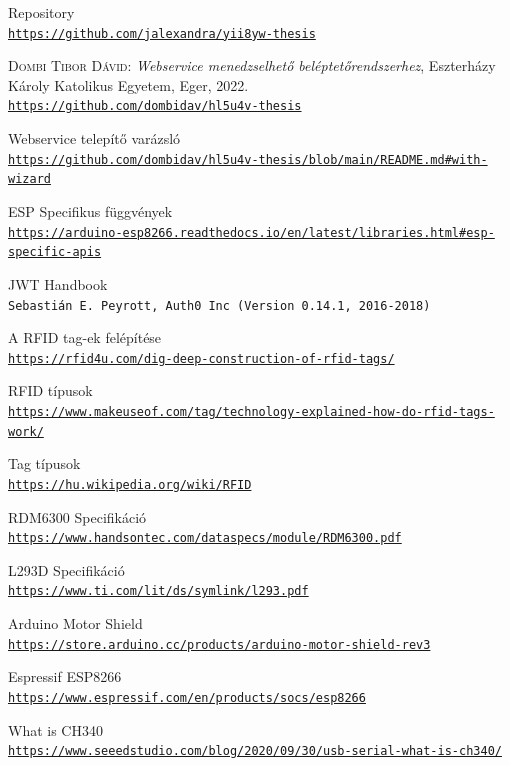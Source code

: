 \documentclass[
]{thesis-ekf}
\theoremstyle{definition}
\theoremstyle{remark}
\begin{document}
\begin{thebibliography}{2}
 Repository
    \\\texttt{\url{https://github.com/jalexandra/yii8yw-thesis}}

\textsc{Dombi Tibor Dávid}: \emph{Webservice menedzselhető beléptetőrendszerhez}, Eszterházy Károly Katolikus Egyetem, Eger, 2022.
\\\texttt{\url{https://github.com/dombidav/hl5u4v-thesis}}

 Webservice telepítő varázsló
    \\\texttt{\url{https://github.com/dombidav/hl5u4v-thesis/blob/main/README.md\#with-wizard}}

 ESP Specifikus függvények
    \\\texttt{\url{https://arduino-esp8266.readthedocs.io/en/latest/libraries.html\#esp-specific-apis}}

JWT Handbook
    \\\texttt{Sebastián E. Peyrott, Auth0 Inc (Version 0.14.1, 2016-2018)}

 A RFID tag-ek felépítése
    \\\texttt{\url{https://rfid4u.com/dig-deep-construction-of-rfid-tags/}}

 RFID típusok
    \\\texttt{\url{https://www.makeuseof.com/tag/technology-explained-how-do-rfid-tags-work/}}

 Tag típusok
    \\\texttt{\url{https://hu.wikipedia.org/wiki/RFID}}

 RDM6300 Specifikáció
    \\\texttt{\url{https://www.handsontec.com/dataspecs/module/RDM6300.pdf}}

 L293D Specifikáció
    \\\texttt{\url{https://www.ti.com/lit/ds/symlink/l293.pdf}}

 Arduino Motor Shield
    \\\texttt{\url{https://store.arduino.cc/products/arduino-motor-shield-rev3}}

 Espressif ESP8266
    \\\texttt{\url{https://www.espressif.com/en/products/socs/esp8266}}

 What is CH340
    \\\texttt{\url{https://www.seeedstudio.com/blog/2020/09/30/usb-serial-what-is-ch340/}}


\end{thebibliography}
\end{document}
